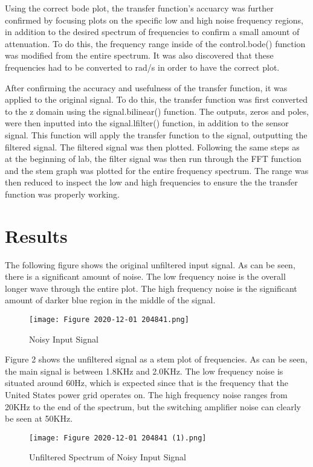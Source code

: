 \documentclass[12pt, titlepage]{article}
\begin{document}
    Using the correct bode plot, the transfer function's accuarcy was further confirmed by focusing plots on the specific low and high noise frequency regions, in addition to the desired spectrum of frequencies to confirm a small amount of attenuation.  To do this, the frequency range inside of the control.bode() function was modified from the entire spectrum.  It was also discovered that these frequencies had to be converted to rad/s in order to have the correct plot.
    
    After confirming the accuracy and usefulness of the transfer function, it was applied to the original signal.  To do this, the transfer function was first converted to the z domain using the signal.bilinear() function.  The outputs, zeros and poles, were then inputted into the signal.lfilter() function, in addition to the sensor signal.  This function will apply the transfer function to the signal, outputting the filtered signal.  The filtered signal was then plotted.  Following the same steps as at the beginning of lab, the filter signal was then run through the FFT function and the stem graph was plotted for the entire frequency spectrum.  The range was then reduced to inspect the low and high frequencies to ensure the the transfer function was properly working.
    
   \clearpage
    \section{Results}
    
    The following figure shows the original unfiltered input signal.  As can be seen, there is a significant amount of noise.  The low frequency noise is the overall longer wave through the entire plot.  The high frequency noise is the significant amount of darker blue region in the middle of the signal.
        \begin{figure}[h!]
            \centering
            \texttt{[image: Figure 2020-12-01 204841.png]}
            \caption{Noisy Input Signal}
            \label{fig:my_label}
        \end{figure}
        
    \clearpage
    Figure 2 shows the unfiltered signal as a stem plot of frequencies.  As can be seen, the main signal is between 1.8KHz and 2.0KHz.  The low frequency noise is situated around 60Hz, which is expected since that is the frequency that the United States power grid operates on.  The high frequency noise ranges from 20KHz to the end of the spectrum, but the switching amplifier noise can clearly be seen at 50KHz.
        \begin{figure}[h!]
            \centering
            \texttt{[image: Figure 2020-12-01 204841 (1).png]}
            \caption{Unfiltered Spectrum of Noisy Input Signal}
            \label{fig:my_label}
        \end{figure}
        
\end{document}
